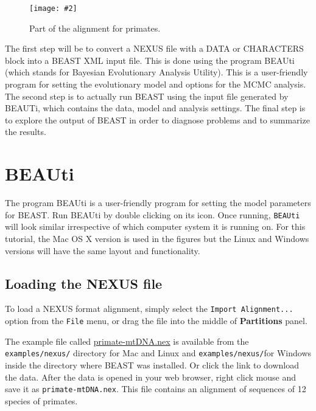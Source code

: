 \documentclass[12pt]{article}
\newcommand{\includeimage}[2][]{%
\texttt{[image: \#2]}
}
\begin{document}
\begin{figure}	
\centering
\includeimage[width=\textwidth]{figures/AlignmentViewer}
\caption{Part of the alignment for primates.}
\label{fig:primateAlignment}
\end{figure}

The first step will be to convert a NEXUS file with a DATA or CHARACTERS block into a BEAST XML input file. This is done using the program BEAUti (which stands for Bayesian Evolutionary Analysis Utility). 
This is a user-friendly program for setting the evolutionary model and options for the MCMC analysis. 
The second step is to actually run BEAST using the input file generated by BEAUTi,  which
contains the data, model and analysis settings. 
The final step is to explore the output of BEAST in order to diagnose problems and to summarize the results.

\section{BEAUti}

The program BEAUti is a user-friendly program for setting the
model parameters for BEAST. Run BEAUti by double clicking on its icon. Once running, \texttt{BEAUti} will look similar irrespective
of which computer system it is running on. For this tutorial, the Mac OS X version is used in the figures but
the Linux and Windows versions will have the same layout and functionality.


\subsection{Loading the NEXUS file }

To load a NEXUS format alignment, simply select the \texttt{Import Alignment...} option from the \texttt{File} menu, or drag the file into the middle of {\bf Partitions} panel. 

The example file called \href{https://github.com/CompEvol/beast2/blob/master/examples/nexus/primate-mtDNA.nex?raw=true}{primate-mtDNA.nex} is available from the {\tt examples/nexus/} directory for Mac and Linux and  {\tt examples/nexus/}for Windows inside the directory where BEAST was installed. Or click the link to download the data. After the data is opened in your web browser, right click mouse and save it as \texttt{primate-mtDNA.nex}.
This file contains an alignment of sequences of 12 species of primates. 
\end{document}

